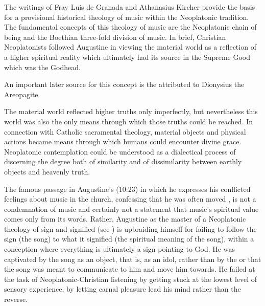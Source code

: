 The writings of Fray Luis de Granada and Athanasius Kircher provide the basis
for a provisional historical theology of music within the Neoplatonic
tradition. 
The fundamental concepts of this theology of music are the Neoplatonic chain of
being and the Boethian three-fold division of music.
In brief, Christian Neoplatonists followed Augustine in viewing the material
world as a reflection of a higher spiritual reality which ultimately had its
source in the Supreme Good which was the Godhead.%
\begin{Footnote}
    An important later source for this concept is the  attributed to Dionysius the Areopagite.
\end{Footnote}
The material world reflected higher truths only imperfectly, but nevertheless
this world was also the only means through which those truths could be reached.
In connection with Catholic sacramental theology, material objects and physical
actions became means through which humans could encounter divine grace.
Neoplatonic contemplation could be understood as a dialectical process of
discerning the degree both of similarity and of dissimilarity between earthly
objects and heavenly truth.

The famous passage in Augustine's  (10:23) in which he
expresses his conflicted feelings about music in the church, confessing that he
was often moved , is not a
condemnation of music and certainly not a statement that music's spiritual
value comes only from its words.
Rather, Augustine as the master of a Neoplatonic theology of sign and signified
(see ) is upbraiding himself for failing to
follow the sign (the song) to what it signified (the spiritual meaning of the
song), within a conception where everything is ultimately a sign pointing to
God.
He was captivated by the song as an object, that is, as an idol, rather than by
the  or  that the song was meant to
communicate to him and move him towards. 
He failed at the task of Neoplatonic-Christian listening by getting stuck at
the lowest level of sensory experience, by letting carnal pleasure lead his
mind rather than the reverse.

